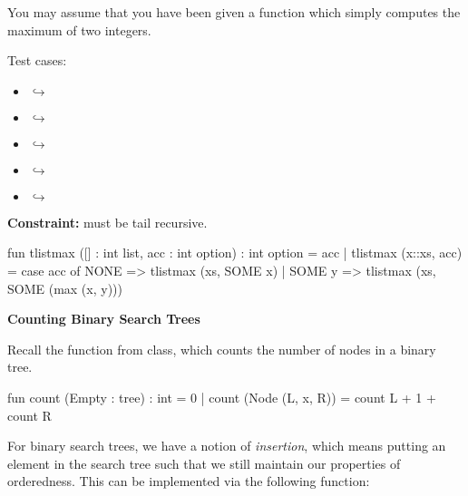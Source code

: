 \documentclass[addpoints,12pt, answers]{exam}
\newenvironment{constraint}{\color{constraint_color}\textbf{Constraint:}}{}
\begin{document}
\begin{questions}
\begin{parts}
  You may assume that you have been given a function
   which simply computes the maximum of two integers.

  \vspace{3pt}

  Test cases:
  \begin{itemize}
    \item {} $\hookrightarrow$ 
    \item {} $\hookrightarrow$ 
    \item {} $\hookrightarrow$ 
    \item {} $\hookrightarrow$ 
    \item {} $\hookrightarrow$ 
  \end{itemize}

  \begin{constraint}
     must be tail recursive.
  \end{constraint}

  \begin{solutionorbox}[20em]
    \begin{codeblock}
      fun tlistmax ([] : int list, acc : int option) : int option = acc
        | tlistmax (x::xs, acc) =
            case acc of
              NONE => tlistmax (xs, SOME x)
            | SOME y => tlistmax (xs, SOME (max (x, y)))
    \end{codeblock}
  \end{solutionorbox}
\end{parts}

\newpage
{}

\textbf{Counting Binary Search Trees}

Recall the  function from class, which counts the number of
nodes in a binary tree.

\begin{codeblock}
  fun count (Empty : tree) : int = 0
    | count (Node (L, x, R)) = count L + 1 + count R
\end{codeblock}

For binary search trees, we have a notion of \textit{insertion}, which
means putting an element in the search tree such that we still maintain
our properties of orderedness. This can be implemented via the following
function:


\end{questions}
\end{document}
